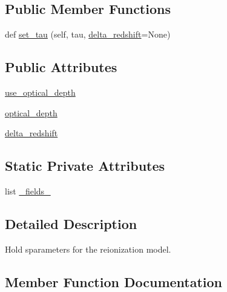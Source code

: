 \subsection*{Public Member Functions}
\begin{DoxyCompactItemize}
\item 
def \mbox{\hyperlink{classcamb_1_1reionization_1_1ReionizationParams_a9ed1e9834f60e2aa92947a7b4a151404}{set\+\_\+tau}} (self, tau, \mbox{\hyperlink{classcamb_1_1reionization_1_1ReionizationParams_abac714e2521b5c0b169e56240da98bef}{delta\+\_\+redshift}}=None)
\end{DoxyCompactItemize}
\subsection*{Public Attributes}
\begin{DoxyCompactItemize}
\item 
\mbox{\hyperlink{classcamb_1_1reionization_1_1ReionizationParams_a8ae74c7562f07dea4e95379d88485e2c}{use\+\_\+optical\+\_\+depth}}
\item 
\mbox{\hyperlink{classcamb_1_1reionization_1_1ReionizationParams_aa238325763d7f20e1fa137fcef5d0180}{optical\+\_\+depth}}
\item 
\mbox{\hyperlink{classcamb_1_1reionization_1_1ReionizationParams_abac714e2521b5c0b169e56240da98bef}{delta\+\_\+redshift}}
\end{DoxyCompactItemize}
\subsection*{Static Private Attributes}
\begin{DoxyCompactItemize}
\item 
list \mbox{\hyperlink{classcamb_1_1reionization_1_1ReionizationParams_ac78689867e8359453ae901e9bd562e21}{\+\_\+fields\+\_\+}}
\end{DoxyCompactItemize}


\subsection{Detailed Description}
\begin{DoxyVerb}Hold sparameters for the reionization model.
\end{DoxyVerb}
 

\subsection{Member Function Documentation}
\mbox{\label{classcamb_1_1reionization_1_1ReionizationParams_a9ed1e9834f60e2aa92947a7b4a151404}} 

